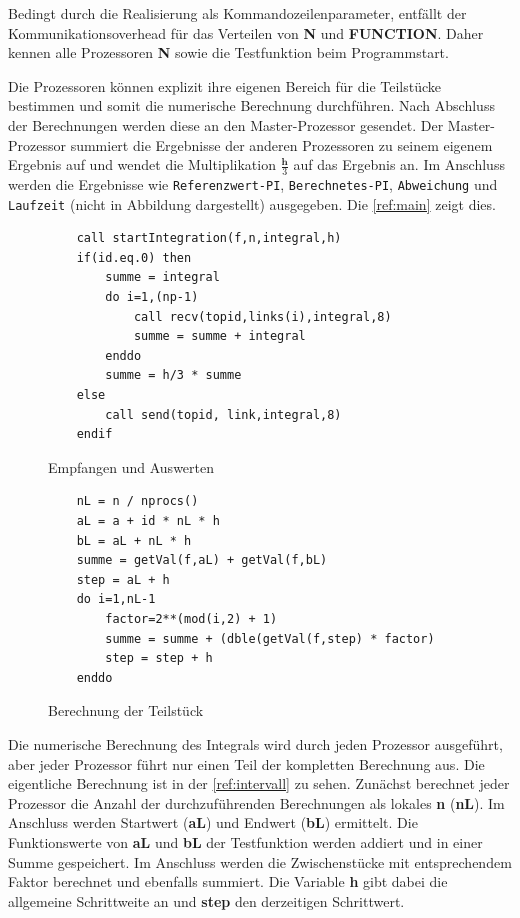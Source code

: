 Bedingt durch die Realisierung als Kommandozeilenparameter, entfällt der Kommunikationsoverhead für das Verteilen von \textbf{N} und \textbf{FUNCTION}.
Daher kennen alle Prozessoren \textbf{N} sowie die Testfunktion beim Programmstart.

Die Prozessoren können explizit ihre eigenen Bereich für die Teilstücke bestimmen und somit die numerische Berechnung durchführen.
Nach Abschluss der Berechnungen werden diese an den Master-Prozessor gesendet.
Der Master-Prozessor summiert die Ergebnisse der anderen Prozessoren zu seinem eigenem Ergebnis auf und wendet die Multiplikation $\frac{\textbf{h}}{3}$ auf das Ergebnis an.
Im Anschluss werden die Ergebnisse wie \texttt{Referenzwert-PI}, \texttt{Berechnetes-PI}, \texttt{Abweichung} und \texttt{Laufzeit} (nicht in Abbildung dargestellt) ausgegeben. 
Die \autoref{ref:main} zeigt dies.
\begin{figure}[h]
\hrulefill

\begin{minipage}{0.49\textwidth}
\begin{lstlisting}
	call startIntegration(f,n,integral,h)
	if(id.eq.0) then
		summe = integral
		do i=1,(np-1)
			call recv(topid,links(i),integral,8)
			summe = summe + integral
		enddo
		summe = h/3 * summe
	else
		call send(topid, link,integral,8)
	endif
\end{lstlisting}
	\caption{Empfangen und Auswerten}
	\label{ref:main}
\end{minipage}
\hfill
\vline
\begin{minipage}{0.49\textwidth}
\begin{lstlisting}
	nL = n / nprocs()
	aL = a + id * nL * h
	bL = aL + nL * h
	summe = getVal(f,aL) + getVal(f,bL)   
	step = aL + h
	do i=1,nL-1
		factor=2**(mod(i,2) + 1)
		summe = summe + (dble(getVal(f,step) * factor)
		step = step + h    
	enddo
\end{lstlisting}
	\caption{Berechnung der Teilstück}
	\label{ref:intervall}
\end{minipage}

\hrulefill
\end{figure}

Die numerische Berechnung des Integrals wird durch jeden Prozessor ausgeführt, aber jeder Prozessor führt nur einen Teil der kompletten Berechnung aus.
Die eigentliche Berechnung ist in der \autoref{ref:intervall} zu sehen.
Zunächst berechnet jeder Prozessor die Anzahl der durchzuführenden Berechnungen als lokales \textbf{n} (\textbf{nL}).
Im Anschluss werden Startwert (\textbf{aL}) und Endwert (\textbf{bL}) ermittelt.
Die Funktionswerte von \textbf{aL} und \textbf{bL} der Testfunktion werden addiert und in einer Summe gespeichert.
Im Anschluss werden die Zwischenstücke mit entsprechendem Faktor berechnet und ebenfalls summiert.
Die Variable \textbf{h} gibt dabei die allgemeine Schrittweite an und \textbf{step} den derzeitigen Schrittwert.

